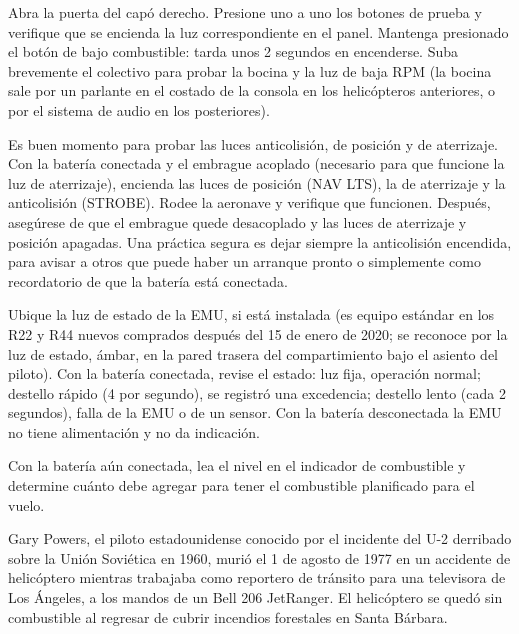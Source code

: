 Abra la puerta del capó derecho. Presione uno a uno los botones de prueba y verifique que se encienda la luz correspondiente en el panel. Mantenga presionado el botón de bajo combustible: tarda unos 2 segundos en encenderse. Suba brevemente el colectivo para probar la bocina y la luz de baja RPM (la bocina sale por un parlante en el costado de la consola en los helicópteros anteriores, o por el sistema de audio en los posteriores).

\begin{nota}
Es buen momento para probar las luces anticolisión, de posición y de aterrizaje. Con la batería conectada y el embrague acoplado (necesario para que funcione la luz de aterrizaje), encienda las luces de posición (\textsf{NAV LTS}), la de aterrizaje y la anticolisión (\textsf{STROBE}). Rodee la aeronave y verifique que funcionen. Después, asegúrese de que el embrague quede desacoplado y las luces de aterrizaje y posición apagadas. Una práctica segura es dejar siempre la anticolisión encendida, para avisar a otros que puede haber un arranque pronto o simplemente como recordatorio de que la batería está conectada.
\end{nota}

Ubique la luz de estado de la EMU, si está instalada (es equipo estándar en los R22 y R44 nuevos comprados después del 15 de enero de 2020; se reconoce por la luz de estado, ámbar, en la pared trasera del compartimiento bajo el asiento del piloto). Con la batería conectada, revise el estado: luz fija, operación normal; destello rápido (4 por segundo), se registró una excedencia; destello lento (cada 2 segundos), falla de la EMU o de un sensor. Con la batería desconectada la EMU no tiene alimentación y no da indicación.

Con la batería aún conectada, lea el nivel en el indicador de combustible y determine cuánto debe agregar para tener el combustible planificado para el vuelo.

\begin{caso}
Gary Powers, el piloto estadounidense conocido por el incidente del U-2 derribado sobre la Unión Soviética en 1960, murió el 1 de agosto de 1977 en un accidente de helicóptero mientras trabajaba como reportero de tránsito para una televisora de Los Ángeles, a los mandos de un Bell 206 JetRanger. El helicóptero se quedó sin combustible al regresar de cubrir incendios forestales en Santa Bárbara.
\end{caso}

